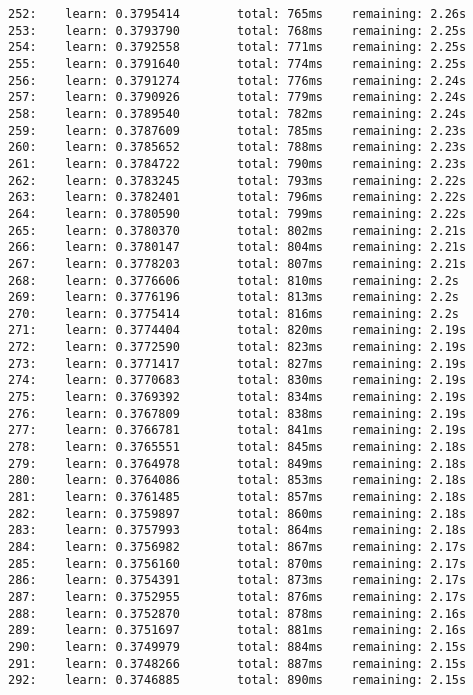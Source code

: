 \documentclass[11pt]{article}
\begin{document}
\begin{Verbatim}[commandchars=\\\{\}]
252:    learn: 0.3795414        total: 765ms    remaining: 2.26s
253:    learn: 0.3793790        total: 768ms    remaining: 2.25s
254:    learn: 0.3792558        total: 771ms    remaining: 2.25s
255:    learn: 0.3791640        total: 774ms    remaining: 2.25s
256:    learn: 0.3791274        total: 776ms    remaining: 2.24s
257:    learn: 0.3790926        total: 779ms    remaining: 2.24s
258:    learn: 0.3789540        total: 782ms    remaining: 2.24s
259:    learn: 0.3787609        total: 785ms    remaining: 2.23s
260:    learn: 0.3785652        total: 788ms    remaining: 2.23s
261:    learn: 0.3784722        total: 790ms    remaining: 2.23s
262:    learn: 0.3783245        total: 793ms    remaining: 2.22s
263:    learn: 0.3782401        total: 796ms    remaining: 2.22s
264:    learn: 0.3780590        total: 799ms    remaining: 2.22s
265:    learn: 0.3780370        total: 802ms    remaining: 2.21s
266:    learn: 0.3780147        total: 804ms    remaining: 2.21s
267:    learn: 0.3778203        total: 807ms    remaining: 2.21s
268:    learn: 0.3776606        total: 810ms    remaining: 2.2s
269:    learn: 0.3776196        total: 813ms    remaining: 2.2s
270:    learn: 0.3775414        total: 816ms    remaining: 2.2s
271:    learn: 0.3774404        total: 820ms    remaining: 2.19s
272:    learn: 0.3772590        total: 823ms    remaining: 2.19s
273:    learn: 0.3771417        total: 827ms    remaining: 2.19s
274:    learn: 0.3770683        total: 830ms    remaining: 2.19s
275:    learn: 0.3769392        total: 834ms    remaining: 2.19s
276:    learn: 0.3767809        total: 838ms    remaining: 2.19s
277:    learn: 0.3766781        total: 841ms    remaining: 2.19s
278:    learn: 0.3765551        total: 845ms    remaining: 2.18s
279:    learn: 0.3764978        total: 849ms    remaining: 2.18s
280:    learn: 0.3764086        total: 853ms    remaining: 2.18s
281:    learn: 0.3761485        total: 857ms    remaining: 2.18s
282:    learn: 0.3759897        total: 860ms    remaining: 2.18s
283:    learn: 0.3757993        total: 864ms    remaining: 2.18s
284:    learn: 0.3756982        total: 867ms    remaining: 2.17s
285:    learn: 0.3756160        total: 870ms    remaining: 2.17s
286:    learn: 0.3754391        total: 873ms    remaining: 2.17s
287:    learn: 0.3752955        total: 876ms    remaining: 2.17s
288:    learn: 0.3752870        total: 878ms    remaining: 2.16s
289:    learn: 0.3751697        total: 881ms    remaining: 2.16s
290:    learn: 0.3749979        total: 884ms    remaining: 2.15s
291:    learn: 0.3748266        total: 887ms    remaining: 2.15s
292:    learn: 0.3746885        total: 890ms    remaining: 2.15s

\end{Verbatim}
\end{document}
